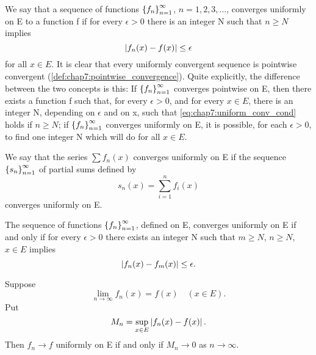 \begin{definition} %
  \label{def:chap7:uniform_convergence}
  We say that a sequence of functions $\left\{ f_n \right\}_{n=1}^\infty$, $n=1, 2, 3,
  \dots$, converges uniformly on E to a function f if for every
  $\epsilon > 0$ there is an integer N such that $n \ge N$ implies
  \begin{equation} \label{eq:chap7:uniform_conv_cond}
    \left\lvert f_n(x) - f(x) \right\rvert \le \epsilon
  \end{equation}
  for all $x \in E$.
  It is clear that every uniformly convergent sequence is pointwise
  convergent (\autoref{def:chap7:pointwise_convergence}). Quite
  explicitly, the difference between the two concepts is this: If
  $\left\{ f_n \right\}_{n=1}^\infty$ converges pointwise on E, then there exists a
  function f such that, for every $\epsilon > 0$, and for every $x
  \in E$, there is an integer N, depending on $\epsilon$ and on x,
  such that \eqref{eq:chap7:uniform_conv_cond} holds if $n \ge N$; if
  $\left\{ f_n \right\}_{n=1}^\infty$ converges uniformly on E, it is possible, for each
  $\epsilon > 0$, to find one integer N which will do for all $x \in E$.

  We say that the series $\sum f_n(x)$ converges uniformly on E if
  the sequence $\left\{ s_n \right\}_{n=1}^\infty$ of partial sums defined by
  \[ s_n(x) = \sum_{i=1}^n f_i(x) \]
  converges uniformly on E.
\end{definition}

\begin{theorem} %
  \label{thm:chap7:cauchy_uniform_conv}
  The sequence of functions $\left\{ f_n \right\}_{n=1}^\infty$, defined on E, converges
  uniformly on E if and only if for every $\epsilon > 0$ there exists
  an integer N such that $m \ge N$, $n \ge N$, $x \in E$ implies
  \begin{equation} \label{eq:chap7:cauchy_uniform_cond}
    \left\lvert f_n(x) - f_m(x) \right\rvert \le \epsilon.
  \end{equation}
\end{theorem}

\begin{theorem} %
  \label{thm:chap7:uniform_conv_sup_norm}
  Suppose
  \[ \lim_{n \to \infty} f_n(x) = f(x) \quad (x \in E). \]
  Put
  \[ M_n = \sup_{x \in E} \left\lvert f_n(x) - f(x) \right\rvert. \]
  Then $f_n \to f$ uniformly on E if and only if $M_n \to 0$ as $n \to \infty$.
\end{theorem}

